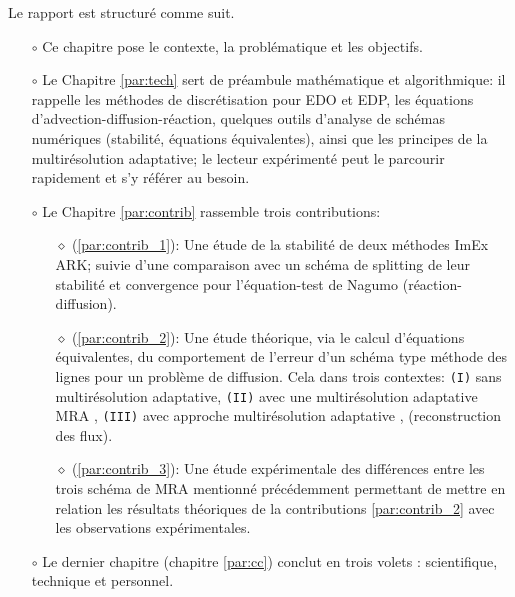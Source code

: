 Le rapport est structuré comme suit.
\begin{itemize}
\item[$\circ$] Ce chapitre pose le contexte, la problématique et les objectifs.
\item[$\circ$] Le Chapitre \ref{par:tech} sert de préambule mathématique et algorithmique:
il rappelle les méthodes de discrétisation pour EDO et EDP, les équations d'advection-diffusion-réaction, 
quelques outils d'analyse de schémas numériques (stabilité, équations équivalentes), ainsi que les principes de la multirésolution adaptative; 
le lecteur expérimenté peut le parcourir rapidement et s'y référer au besoin.
\item[$\circ$] Le Chapitre \ref{par:contrib} rassemble trois contributions:
\begin{itemize}
    \item[$\diamond$] (\ref{par:contrib_1}): Une étude de la stabilité de deux méthodes ImEx ARK;
    suivie d'une comparaison avec un schéma de splitting de leur stabilité et convergence pour l'équation-test de Nagumo (réaction-diffusion).
    \item[$\diamond$] (\ref{par:contrib_2}): Une étude théorique, via le calcul d'équations équivalentes, 
    du comportement de l'erreur d'un schéma type méthode des lignes pour un problème de diffusion. 
    Cela dans trois contextes: 
    \texttt{(I)} sans multirésolution adaptative, 
    \texttt{(II)} avec une multirésolution adaptative MRA ,
    \texttt{(III)} avec approche multirésolution adaptative , (reconstruction des flux).
    \item[$\diamond$] (\ref{par:contrib_3}): Une étude expérimentale des différences entre les trois schéma de MRA mentionné précédemment 
    permettant de mettre en relation les résultats théoriques de la contributions \ref{par:contrib_2} avec les observations expérimentales.
\end{itemize}
\item[$\circ$] Le dernier chapitre (chapitre \ref{par:cc}) conclut en trois volets : scientifique, technique et personnel.
\end{itemize}
